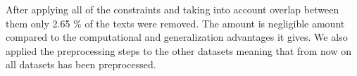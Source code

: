 After applying all of the constraints and taking into account overlap between
them only 2.65 \% of the texts were removed. The amount is negligible amount
compared to the computational and generalization advantages it gives. We also
applied the preprocessing steps to the other datasets meaning that from now on
all datasets has been preprocessed.

\begin{figure}[htb]
    \begin{minipage}{.5\linewidth}
        \centering
    \end{minipage}%
    \begin{minipage}{.5\linewidth}
        \centering
\end{minipage}
\end{figure}
